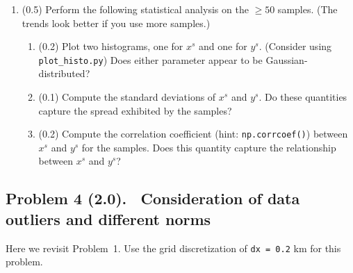 \documentclass[11pt,titlepage,fleqn]{article}
\begin{document}
\begin{enumerate}
\item (0.5) Perform the following statistical analysis on the $\ge50$ samples. (The trends look better if you use more samples.)
%
\begin{enumerate}
\item (0.2) Plot two histograms, one for $x^s$ and one for $y^s$. (Consider using \verb+plot_histo.py+)
Does either parameter appear to be Gaussian-distributed?

\item (0.1) Compute the standard deviations of $x^s$ and $y^s$.
Do these quantities capture the spread exhibited by the samples?

\item (0.2) Compute the correlation coefficient (hint: \verb+np.corrcoef()+) between $x^s$ and $y^s$ for the samples.
Does this quantity capture the relationship between $x^s$ and $y^s$?

\end{enumerate}

\end{enumerate}


\pagebreak
\subsection*{Problem 4 (2.0). \ptag\ Consideration of data outliers and different norms}

Here we revisit Problem~1. Use the grid discretization of \verb+dx = 0.2+ km for this problem.
\end{document}
